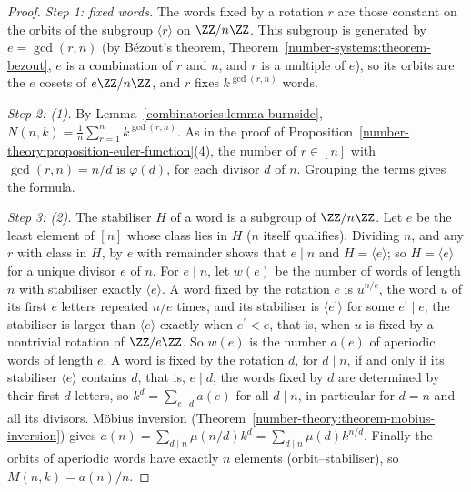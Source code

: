 \begin{proof}
\emph{Step 1: fixed words.} The words fixed by a rotation $r$ are those constant on the orbits of the subgroup $\langle r \rangle$ on $\ZZ/n\ZZ$. This subgroup is generated by $e = \gcd(r, n)$ (by
B\'ezout's theorem, Theorem~\ref{number-systems:theorem-bezout}, $e$ is a combination of $r$ and $n$, and $r$ is a multiple of $e$), so its orbits are the $e$ cosets of $e\ZZ/n\ZZ$, and $r$ fixes
$k^{\gcd(r, n)}$ words.

\emph{Step 2: (1).} By Lemma~\ref{combinatorics:lemma-burnside}, $N(n, k) = \frac1n\sum_{r=1}^{n}k^{\gcd(r, n)}$. As in the proof of Proposition~\ref{number-theory:proposition-euler-function}(4), the number
of $r \in [n]$ with $\gcd(r, n) = n/d$ is $\varphi(d)$, for each divisor $d$ of $n$. Grouping the terms gives the formula.

\emph{Step 3: (2).} The stabiliser $H$ of a word is a subgroup of $\ZZ/n\ZZ$. Let $e$ be the least element of $[n]$ whose class lies in $H$ ($n$ itself qualifies). Dividing $n$, and any $r$ with
class in $H$, by $e$ with remainder shows that $e \mid n$ and $H = \langle e \rangle$; so $H = \langle e \rangle$ for a unique divisor $e$ of $n$. For $e \mid n$, let $w(e)$ be the number of words of
length $n$ with stabiliser exactly $\langle e \rangle$. A word fixed by the rotation $e$ is $u^{n/e}$, the word $u$ of its first $e$ letters repeated $n/e$ times, and its stabiliser is
$\langle e^{\prime} \rangle$ for some $e^{\prime} \mid e$; the stabiliser is larger than $\langle e \rangle$ exactly when $e^{\prime} < e$, that is, when $u$ is fixed by a nontrivial rotation of
$\ZZ/e\ZZ$. So $w(e)$ is the number $a(e)$ of aperiodic words of length $e$. A word is fixed by the rotation $d$, for $d \mid n$, if and only if its stabiliser
$\langle e \rangle$ contains $d$, that is, $e \mid d$; the words fixed by $d$ are determined by their first $d$ letters, so $k^d = \sum_{e \mid d}a(e)$ for all $d \mid n$, in particular for $d = n$
and all its divisors. M\"obius inversion (Theorem~\ref{number-theory:theorem-mobius-inversion}) gives $a(n) = \sum_{d \mid n}\mu(n/d)k^d = \sum_{d \mid n}\mu(d)k^{n/d}$. Finally the orbits of aperiodic
words have exactly $n$ elements (orbit--stabiliser), so $M(n, k) = a(n)/n$.
\end{proof}

